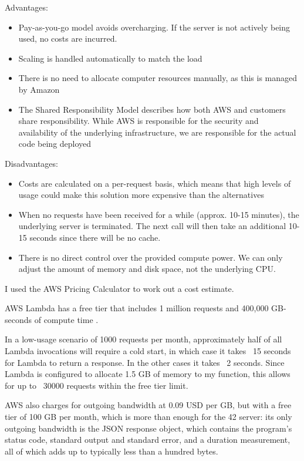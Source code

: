 Advantages:

\begin{itemize}
\item Pay-as-you-go model avoids overcharging. If the server is not actively being used, no costs are incurred.
\item Scaling is handled automatically to match the load
\item There is no need to allocate computer resources manually, as this is managed by Amazon
\item The Shared Responsibility Model describes how both AWS and customers share responsibility. While AWS is responsible for the security and availability of the underlying infrastructure, we are responsible for the actual code being deployed \cite{amazon-web-services-inc-2022B}
\end{itemize}


Disadvantages:

\begin{itemize}
\item Costs are calculated on a per-request basis, which means that high levels of usage could make this solution more expensive than the alternatives
\item When no requests have been received for a while (approx. 10-15 minutes), the underlying server is terminated. The next call will then take an additional 10-15 seconds since there will be no cache.
\item There is no direct control over the provided compute power. We can only adjust the amount of memory and disk space, not the underlying CPU.
\end{itemize}

I used the AWS Pricing Calculator \cite{amazon-web-services-inc-2022C} to work out a cost estimate.

AWS Lambda has a free tier that includes 1 million requests and 400,000 GB-seconds of compute time \cite{amazon-web-services-inc-2022A}.

In a low-usage scenario of 1000 requests per month, approximately half of all Lambda invocations will require a cold start, in which case it takes ~15 seconds for Lambda to return a response. In the other cases it takes ~2 seconds. Since Lambda is configured to allocate 1.5 GB of memory to my function, this allows for up to ~30000 requests within the free tier limit.

AWS also charges for outgoing bandwidth at 0.09 USD per GB, but with a free tier of 100 GB per month, which is more than enough for the 42 server: its only outgoing bandwidth is the JSON response object, which contains the program's status code, standard output and standard error, and a duration measurement, all of which adds up to typically less than a hundred bytes.


